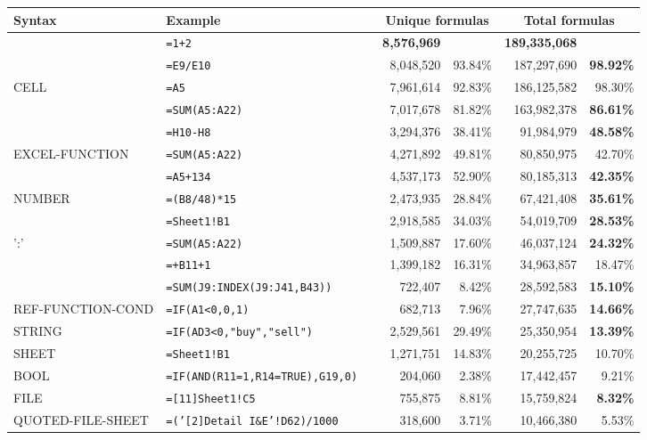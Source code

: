 \begin{tabular}{llrrrrr}
		\hline
		Syntax & Example & &  \multicolumn{2}{c}{Unique formulas} & \multicolumn{2}{c}{Total formulas} \\
		\hline
			\synt{Formula} & \texttt{=1+2} &  & \textbf{8,576,969} & & \textbf{189,335,068} & \\
			\synt{Reference} & \texttt{=E9/E10} &  & 8,048,520 & 93.84\% & 187,297,690 & \textbf{98.92\%}\\
			CELL & \texttt{=A5} &  & 7,961,614 & 92.83\% & 186,125,582 & 98.30\%\\
			\synt{FunctionCall} & \texttt{=SUM(A5:A22)} &  & 7,017,678 & 81.82\% & 163,982,378 & \textbf{86.61\%}\\
			\synt{BinOp} & \texttt{=H10-H8} &  & 3,294,376 & 38.41\% & 91,984,979 & \textbf{48.58\%}\\
			EXCEL-FUNCTION & \texttt{=SUM(A5:A22)} &  & 4,271,892 & 49.81\% & 80,850,975 & 42.70\%\\
			\synt{Constant} & \texttt{=A5+134} &  & 4,537,173 & 52.90\% & 80,185,313 & \textbf{42.35\%}\\
			NUMBER & \texttt{=(B8/48)*15} &  & 2,473,935 & 28.84\% & 67,421,408 & \textbf{35.61\%}\\
			\synt{Prefix} & \texttt{=Sheet1!B1} &  & 2,918,585 & 34.03\% & 54,019,709 & \textbf{28.53\%}\\
			\synt{Reference} ':' \synt{Reference} & \texttt{=SUM(A5:A22)} &  & 1,509,887 & 17.60\% & 46,037,124 & \textbf{24.32\%}\\
			\synt{UnOpPrefix} & \texttt{=+B11+1} &  & 1,399,182 & 16.31\% & 34,963,857 & 18.47\%\\
			\synt{RefFunctionName} & \texttt{=SUM(J9:INDEX(J9:J41,B43))} &  & 722,407 & 8.42\% & 28,592,583 & \textbf{15.10\%}\\
			REF-FUNCTION-COND & \texttt{=IF(A1<0,0,1)} &  & 682,713 & 7.96\% & 27,747,635 & \textbf{14.66\%}\\
			STRING & \texttt{=IF(AD3<0,"buy","sell")} &  & 2,529,561 & 29.49\% & 25,350,954 & \textbf{13.39\%}\\
			SHEET & \texttt{=Sheet1!B1} &  & 1,271,751 & 14.83\% & 20,255,725 & 10.70\%\\
			BOOL & \texttt{=IF(AND(R11=1,R14=TRUE),G19,0)} &  & 204,060 & 2.38\% & 17,442,457 & 9.21\%\\
			FILE & \texttt{=[11]Sheet1!C5} &  & 755,875 & 8.81\% & 15,759,824 & \textbf{8.32\%}\\
			QUOTED-FILE-SHEET & \texttt{=('[2]Detail I\&E'!D62)/1000} &  & 318,600 & 3.71\% & 10,466,380 & 5.53\%\\

\end{tabular}
